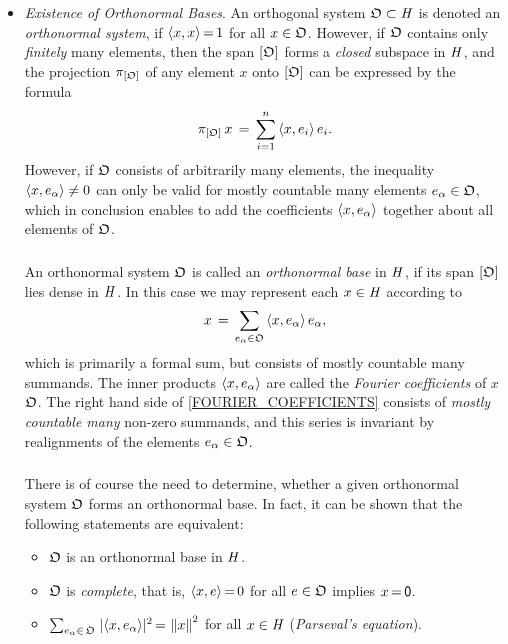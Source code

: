 \documentclass[11pt,twoside]{article}
\begin{document}
\begin{itemize}[leftmargin=15pt,itemsep=6pt]
\item[4.] \textit{Existence of Orthonormal Bases}.
An orthogonal system $\mathfrak{O} \subset \mathit{H}$ is denoted
an \textit{orthonormal system},
if $\langle x,x \rangle {\,=\,} 1$ for all $x \in \mathfrak{O}$.
However,
if $\mathfrak{O}$ contains only \textit{finitely} many elements,
then the span $[\mathfrak{O}]$ forms a \textit{closed} subspace in $\mathit{H}$,
and the projection $\pi_{[\mathfrak{O}]}$ of any element $x$ onto $[\mathfrak{O}]$
can be expressed by the formula
\[
\pi_{[\mathfrak{O}]} \, x \,=\, \sum_{i=1}^n \, \langle x,e_i \rangle \, e_i.
\]
However,
if $\mathfrak{O}$ consists of arbitrarily many elements,
the inequality $\langle x,e_{\alpha} \rangle \neq 0$ can only be valid
for mostly countable many elements $e_{\alpha} \in \mathfrak{O}$,
which in conclusion enables to add the coefficients $\langle x,e_{\alpha} \rangle$
together about all elements of $\mathfrak{O}$.

\subparagraph*{} %
An orthonormal system $\mathfrak{O}$ is called
an \textit{orthonormal base} in $\mathit{H}$,
if its span $[ \mathfrak{O} ]$ lies dense in $\mathit{H}$.
In this case we may represent each $x \in \mathit{H}$ according to
\begin{equation}\label{FOURIER_COEFFICIENTS}
x \,=\, \sum_{e_{\alpha} \in \mathfrak{O}} \, \langle x,e_{\alpha} \rangle \, e_{\alpha},
\end{equation}
which is primarily a formal sum,
but consists of mostly countable many summands.
The inner products $\langle x,e_{\alpha} \rangle$ are called
the \textit{Fourier coefficients} of $x$ {\wrt} $\mathfrak{O}$.
The right hand side of \eqref{FOURIER_COEFFICIENTS}
consists of \textit{mostly countable many} non-zero summands,
and this series is invariant
by realignments of the elements $e_{\alpha} \in \mathfrak{O}$.

\subparagraph*{}
There is of course the need to determine,
whether a given orthonormal system $\mathfrak{O}$ forms an orthonormal base.
In fact,
it can be shown that
the following statements are equivalent:

\begin{itemize}[leftmargin=20pt,itemsep=3pt]
\item[(a)]
$\mathfrak{O}$ is an orthonormal base in $\mathit{H}$.

\item[(b)]
$\mathfrak{O}$ is \textit{complete},
that is,
$\langle x,e \rangle {\,=\,} 0$ for all $e \in \mathfrak{O}$ implies $x {\,=\,} {\mathsf{0}}$.

\item[(c)]
$\sum_{e_{\alpha} \in \,\orthO} \;
\abs{ \scalar{x}{e_{\alpha}} } ^2 \eq \norm{x}^2$ for all $x \in \mathit{H}$
(\textit{Parseval}\textit{'s equation}).
\end{itemize}


\end{itemize}
\end{document}
